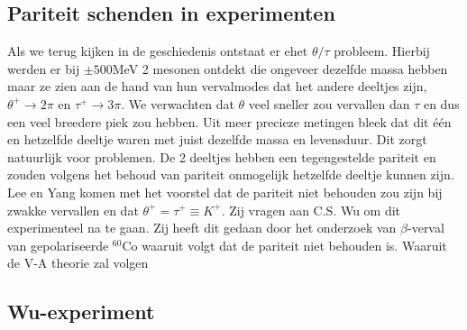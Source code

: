\documentclass[../main.tex]{subfiles}
\begin{document}
\subsection{Pariteit schenden in experimenten}%
\label{sub:pariteit_schenden_in_experimenten}

Als we terug kijken in de geschiedenis ontstaat er ehet $\theta/\tau$ probleem. Hierbij werden er bij $\pm500$MeV 2 mesonen ontdekt die ongeveer dezelfde massa hebben maar ze zien aan de hand van hun vervalmodes dat het andere deeltjes zijn, $\theta^+\rightarrow 2\pi$ en $\tau^+\rightarrow 3\pi$. We verwachten dat $\theta$ veel sneller zou vervallen dan $\tau$ en dus een veel breedere piek zou hebben. Uit meer precieze metingen bleek dat dit één en hetzelfde deeltje waren met juist dezelfde massa en levensduur. Dit zorgt natuurlijk voor problemen. De 2 deeltjes hebben een tegengestelde pariteit en zouden volgens het behoud van pariteit onmogelijk hetzelfde deeltje kunnen zijn. Lee en Yang komen met het voorstel dat de pariteit niet behouden zou zijn bij zwakke vervallen en dat $\theta^+ = \tau^+ \equiv K^+$. Zij vragen aan C.S. Wu om dit experimenteel na te gaan. Zij heeft dit gedaan door het onderzoek van $\beta$-verval van gepolariseerde $^{60}$Co waaruit volgt dat de pariteit niet behouden is. Waaruit de V-A theorie zal volgen

\subsection{Wu-experiment}%
\label{sub:wu_experiment}
\end{document}
